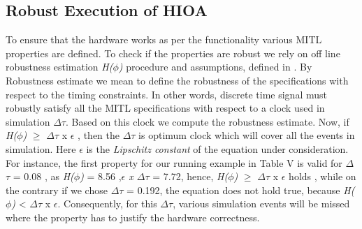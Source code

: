 {\subsection{Robust Execution of HIOA}
To ensure that the hardware works as per the functionality various MITL properties are defined. To check if the properties are robust we rely on off line robustness estimation \textit{H($\phi$)} procedure and assumptions, defined in \citep{fainekos2007robust}. By Robustness estimate we mean to define the robustness of the specifications with respect to the timing constraints. In other words, discrete time signal must robustly satisfy all the MITL specifications with respect to a clock  used in simulation $\Delta$$\tau$. Based on this clock we compute the robustness estimate. Now, if \textit{H($\phi$)} $\geq$ $\Delta$$\tau$ x $\epsilon$ , then the $\Delta$$\tau$ is optimum clock which will cover all the events in simulation. Here $\epsilon$ is the \textit{Lipschitz constant} of the equation under consideration. For instance, the first property for our running example in Table V is valid for $\Delta$$\tau$ = 0.08 , as \textit{H($\phi$)} = 8.56 ,\textit{$\epsilon$ x $\Delta$$\tau$} = 7.72, hence, \textit{H($\phi$)} $\geq$ $\Delta$$\tau$ x  $\epsilon$  holds , while on the contrary if we chose $\Delta$$\tau$ = 0.192, the equation does not hold true, because \textit{H($\phi$)} < $\Delta$$\tau$ x $\epsilon$. Consequently, for this $\Delta$$\tau$, various simulation events will be missed  where the property has to justify the hardware correctness.

\begin{figure}
	

\end{figure}}
